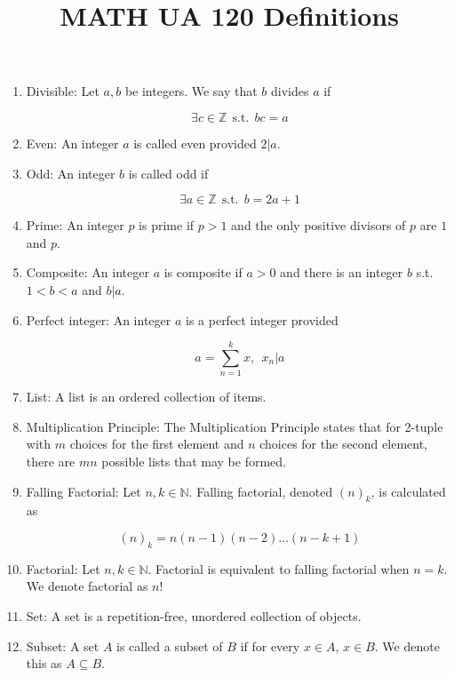 \documentclass{article}
\title{MATH UA 120 Definitions}
\date{}
\begin{document}
	\maketitle
	
	\begin{enumerate}
		\item Divisible: Let $a,b$ be integers.
		We say that $b$ divides $a$ if
		
		\[\exists c\in\mathbb{Z}\:\: \text{s.t.} \:\: bc=a\]
		
		\item Even: An integer $a$ is called even provided $2|a$.
		
		\item Odd: An integer $b$ is called odd if
		
		\[\exists a\in\mathbb{Z} \:\: \text{s.t.} \:\: b=2a+1\]
		
		\item Prime: An integer $p$ is prime if $p>1$ and the only positive divisors of $p$ are $1$ and $p$.
		
		\item Composite: An integer $a$ is composite if $a>0$ and there is an integer $b$ s.t. $1<b<a$ and $b|a$.
		
		\item Perfect integer: An integer $a$ is a perfect integer provided
		
		\[a=\sum_{n=1}^k x,\:\: x_n|a\]
		
		\item List: A list is an ordered collection of items.
		
		\item Multiplication Principle: The Multiplication Principle states that for 2-tuple with $m$ choices for the first element and $n$ choices for the second element, there are $mn$ possible lists that may be formed.
		
		\item Falling Factorial: Let $n,k\in\mathbb{N}$.
		Falling factorial, denoted $(n)_k$, is calculated as
		
		\[(n)_k=n(n-1)(n-2)\dots(n-k+1)\]
		
		\item Factorial: Let $n,k\in\mathbb{N}$.
		Factorial is equivalent to falling factorial when $n=k$.
		We denote factorial as $n!$
		
		\item Set: A set is a repetition-free, unordered collection of objects.
		
		\item Subset: A set $A$ is called a subset of $B$ if for every $x\in A$, $x\in B$.
		We denote this as $A\subseteq B$.
		

\end{enumerate}
\end{document}
